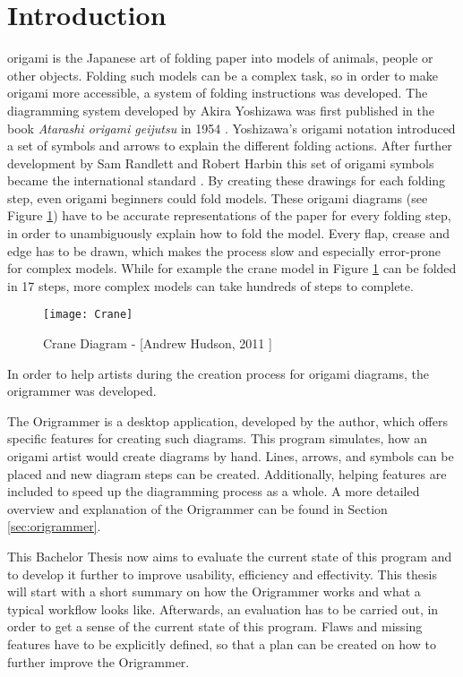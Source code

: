 
\section{Introduction}
\label{sec:introduction}

\gls{origami} is the Japanese art of folding paper into models of animals, people or other objects. Folding such models can be a complex task, so in order to make origami more accessible, a system of folding instructions was developed. The diagramming system developed by Akira Yoshizawa was first published in the book \emph{Atarashi origami geijutsu} in 1954 \cite{Yoshizawa}. Yoshizawa's origami notation introduced a set of symbols and arrows to explain the different folding actions. After further development by Sam Randlett and Robert Harbin this set of origami symbols became the international standard \cite{origamiHistoryWu} \cite{origamiHistoryK}.
By creating these drawings for each folding step, even origami beginners could fold models. These origami diagrams (see Figure \ref{fig:craneDiagram}) have to be accurate representations of the paper for every folding step, in order to unambiguously explain how to fold the model. Every flap, crease and edge has to be drawn, which makes the process slow and especially error-prone for complex models. While for example the crane model in Figure \ref{fig:craneDiagram} can be folded in 17 steps, more complex models can take hundreds of steps to complete. 

\begin{figure}[htbp]
	\centering
	\texttt{[image: Crane]}
	\caption[Crane Diagram]{Crane Diagram - [Andrew Hudson, 2011 \cite{Hudson}]}
	\label{fig:craneDiagram}
\end{figure}

\noindent In order to help artists during the creation process for origami diagrams, the \gls{origrammer} \cite{origrammer} was developed.

The Origrammer is a desktop application, developed by the author, which offers specific features for creating such diagrams. This program simulates, how an origami artist would create diagrams by hand. Lines, arrows, and symbols can be placed and new diagram steps can be created. Additionally, helping features are included to speed up the diagramming process as a whole. A more detailed overview and explanation of the Origrammer can be found in Section \ref{sec:origrammer}.

This Bachelor Thesis now aims to evaluate the current state of this program and to develop it further to improve usability, efficiency and effectivity. This thesis will start with a short summary on how the Origrammer works and what a typical workflow looks like. Afterwards, an evaluation has to be carried out, in order to get a sense of the current state of this program. Flaws and missing features have to be explicitly defined, so that a plan can be created on how to further improve the Origrammer.

